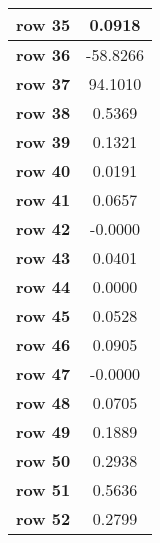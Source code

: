 \begin{tiny}
\begin{tabular}{|l|c|}
\textbf{row 35}&0.0918\\\hline
\textbf{row 36}&-58.8266\\\hline
\textbf{row 37}&94.1010\\\hline
\textbf{row 38}&0.5369\\\hline
\textbf{row 39}&0.1321\\\hline
\textbf{row 40}&0.0191\\\hline
\textbf{row 41}&0.0657\\\hline
\textbf{row 42}&-0.0000\\\hline
\textbf{row 43}&0.0401\\\hline
\textbf{row 44}&0.0000\\\hline
\textbf{row 45}&0.0528\\\hline
\textbf{row 46}&0.0905\\\hline
\textbf{row 47}&-0.0000\\\hline
\textbf{row 48}&0.0705\\\hline
\textbf{row 49}&0.1889\\\hline
\textbf{row 50}&0.2938\\\hline
\textbf{row 51}&0.5636\\\hline
\textbf{row 52}&0.2799\\\hline
\end{tabular}
\end{tiny}